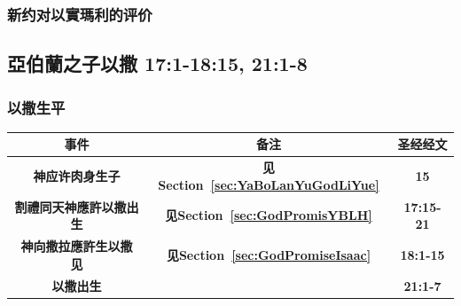 \subsubsection{新约对以實瑪利的评价}




\subsection{亞伯蘭之子以撒 17:1-18:15, 21:1-8}
\subsubsection{以撒生平}
\begin{table}[H]
\begin{threeparttable}
\begin{tabular}{c c c}
\toprule
 \multicolumn{1}{L{\dimexpr0.5\linewidth-1\tabcolsep\relax}}{\bfseries 事件} 
&\multicolumn{1}{L{\dimexpr0.2\linewidth-1\tabcolsep\relax}}{\bfseries  备注}   
&\multicolumn{1}{L{\dimexpr0.1\linewidth-1\tabcolsep\relax}}{\bfseries 圣经经文} \\\hline

\multicolumn{1}{L{\dimexpr0.5\linewidth-1\tabcolsep\relax}}{\bfseries 神应许肉身生子}  
& \multicolumn{1}{L{\dimexpr0.2\linewidth-1\tabcolsep\relax}}{\bfseries 见Section~\ref{sec:YaBoLanYuGodLiYue}}
& \multicolumn{1}{L{\dimexpr0.1\linewidth-1\tabcolsep\relax}}{\bfseries 15}\\ 

\multicolumn{1}{L{\dimexpr0.5\linewidth-1\tabcolsep\relax}}{\bfseries 割禮同天神應許以撒出生}  
& \multicolumn{1}{L{\dimexpr0.2\linewidth-1\tabcolsep\relax}}{\bfseries 见Section~\ref{sec:GodPromisYBLH}}
& \multicolumn{1}{L{\dimexpr0.1\linewidth-1\tabcolsep\relax}}{\bfseries  17:15-21 }\\ 

\multicolumn{1}{L{\dimexpr0.5\linewidth-1\tabcolsep\relax}}{\bfseries 神向撒拉應許生以撒  见}  
& \multicolumn{1}{L{\dimexpr0.2\linewidth-1\tabcolsep\relax}}{\bfseries 见Section~\ref{sec:GodPromiseIsaac}}
& \multicolumn{1}{L{\dimexpr0.1\linewidth-1\tabcolsep\relax}}{\bfseries 18:1-15}\\ 

\multicolumn{1}{L{\dimexpr0.5\linewidth-1\tabcolsep\relax}}{\bfseries 以撒出生 }  
& \multicolumn{1}{L{\dimexpr0.2\linewidth-1\tabcolsep\relax}}{\bfseries }
& \multicolumn{1}{L{\dimexpr0.1\linewidth-1\tabcolsep\relax}}{\bfseries 21:1-7}\\ 


\end{tabular}
\end{threeparttable}
\end{table}
